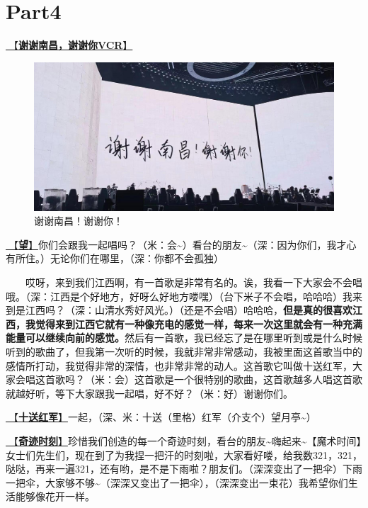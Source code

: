 \documentclass[]{ctexbook}
\begin{document}
\section{Part4}\label{nanchang-20241123-part4}

\hyperref[thank-you-vcr]{🎥【\textbf{谢谢南昌，谢谢你VCR}】}

\begin{figure}

{\centering \includegraphics[width=400pt]{img/nanchang-20241123/thank-nanchang} 

}

\caption{谢谢南昌！谢谢你！}\label{fig:unnamed-chunk-143}
\end{figure}

\hyperref[hope]{🎵【\textbf{望}】}你们会跟我一起唱吗？（米：会\textasciitilde）看台的朋友\textasciitilde（深：因为你们，我才心有所住。）无论你们在哪里，（深：你都不会孤独）

  哎呀，来到我们江西啊，有一首歌是非常有名的。诶，我看一下大家会不会唱哦。（深：江西是个好地方，好呀么好地方喽嘿）（台下米子不会唱，哈哈哈）我来到是江西吗？（深：山清水秀好风光。）（还是不会唱）哈哈哈，\textbf{但是真的很喜欢江西，我觉得来到江西它就有一种像充电的感觉一样，每来一次这里就会有一种充满能量可以继续向前的感觉。}然后有一首歌，我已经忘了是在哪里听到或是什么时候听到的歌曲了，但我第一次听的时候，我就非常非常感动，我被里面这首歌当中的感情所打动，我觉得非常的深情，也非常非常的动人。这首歌它叫做十送红军，大家会唱这首歌吗？（米：会）这首歌是一个很特别的歌曲，这首歌越多人唱这首歌就越好听，等下大家跟我一起唱，好不好？（米：好）谢谢你们。

\hyperref[Seeing-off-the-Red-Amy]{🎵【\textbf{十送红军}】}一起，（深、米：十送（里格）红军（介支个）望月亭\textasciitilde）

\hyperref[magic-moment]{🎵【\textbf{奇迹时刻}】}珍惜我们创造的每一个奇迹时刻，看台的朋友\textasciitilde 嗨起来\textasciitilde【魔术时间】女士们先生们，现在到了为我捏一把汗的时刻啦，大家看好喽，给我数321，321，哒哒，再来一遍321，还有哟，是不是下雨啦？朋友们。（深深变出了一把伞）下雨一把伞，大家够不够\textasciitilde（深深又变出了一把伞），（深深变出一束花）我希望你们生活能够像花开一样。
\end{document}
